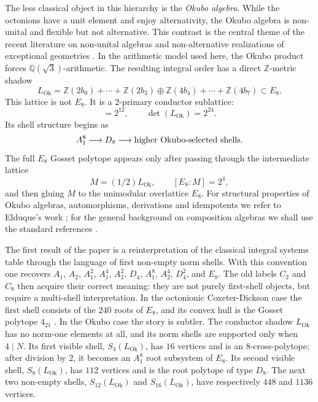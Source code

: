 \documentclass{birkjour}
\newcommand{\LOk}{L_{\mathrm{Ok}}}
\newcommand{\ZZ}{\mathbb Z}
\newcommand{\QQ}{\mathbb Q}
\numberwithin{equation}{section}
\begin{document}
The less classical object in this hierarchy is the \emph{Okubo algebra}. While
the octonions have a unit element and enjoy alternativity, the Okubo algebra is
non-unital and flexible but not alternative. This contrast is the central theme
of the recent literature on non-unital algebras and
non-alternative realizations of exceptional geometries
\cite{MCZ25-OkuboPhysics,CZ22-OkuboSpin,CMZ24-MinimalCayley}. In the arithmetic
model used here, the Okubo product forces \(\QQ(\sqrt3)\)-arithmetic. The
resulting integral order has a direct \(\ZZ\)-metric shadow
\begin{equation}
\LOk=\ZZ(2b_0)+\cdots+\ZZ(2b_3)
\oplus \ZZ(4b_4)+\cdots+\ZZ(4b_7)
\subset E_8.
\end{equation}
This lattice is not \(E_8\). It is a \(2\)-primary conductor sublattice:
\begin{equation}
[E_8:\LOk]=2^{12},\qquad \det(\LOk)=2^{24}.
\end{equation}
Its shell structure begins as
\begin{equation}
A_1^8 \longrightarrow D_8 \longrightarrow
\hbox{higher Okubo-selected shells}.
\end{equation}
The full \(E_8\) Gosset polytope appears only after passing through the
intermediate lattice
\begin{equation}
M=(1/2)\LOk,\qquad [E_8:M]=2^4,
\end{equation}
and then gluing \(M\) to the unimodular overlattice \(E_8\). For structural
properties of Okubo algebras, automorphisms, derivations and idempotents we
refer to Elduque's work \cite{ElduqueOkubo}; for the general background on
composition algebras we shall use the standard references
\cite{baez-octonions,springer-veldkamp,ElduqueComposition}.

The first result of the paper is a reinterpretation of the classical integral
systems table through the language of first non-empty norm shells. With this
convention one recovers \(A_1\), \(A_2\), \(A_1^2\), \(A_1^4\), \(A_2^2\),
\(D_4\), \(A_1^8\), \(A_2^4\), \(D_4^2\), and \(E_8\). The old labels \(C_2\)
and \(C_8\) then acquire their correct meaning: they are not purely first-shell
objects, but require a multi-shell interpretation. In the octonionic
Coxeter-Dickson case the first shell consists of the
\(240\) roots of \(E_8\), and its convex hull is the Gosset polytope \(4_{21}\)
\cite{conway-sloane,coxeter-polytopes}. In the Okubo case the story is subtler.
The conductor shadow \(\LOk\) has no norm-one elements at all, and its norm
shells are supported only when \(4\mid N\). Its first visible shell,
\(S_4(\LOk)\), has \(16\) vertices and is an \(8\)-cross-polytope; after
division by \(2\), it becomes an \(A_1^8\) root subsystem of \(E_8\). Its second
visible shell, \(S_8(\LOk)\), has \(112\) vertices and is the root polytope of
type \(D_8\). The next two non-empty shells, \(S_{12}(\LOk)\) and
\(S_{16}(\LOk)\), have respectively \(448\) and \(1136\) vertices.
\end{document}
